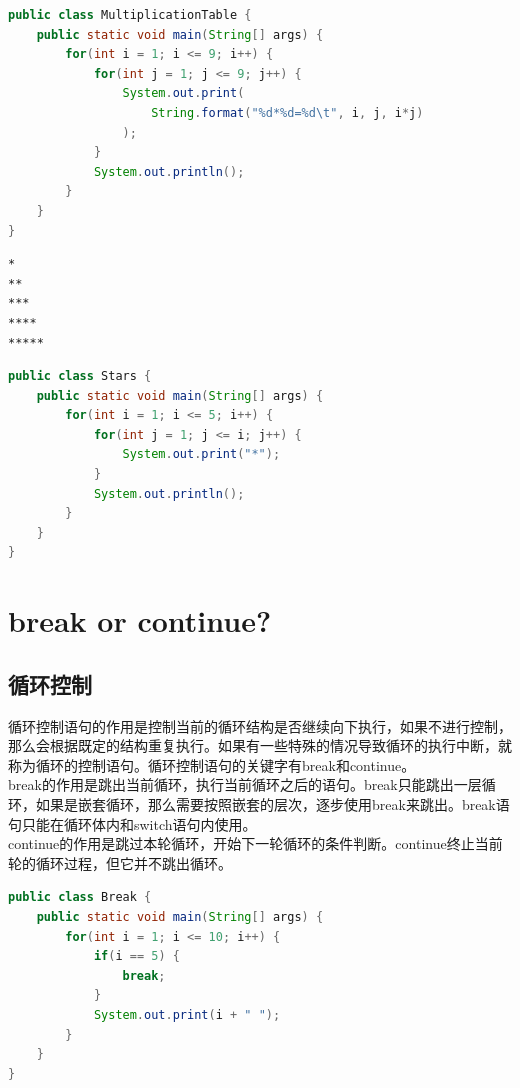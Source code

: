 \begin{lstlisting}[language=Java]
public class MultiplicationTable {
    public static void main(String[] args) {
        for(int i = 1; i <= 9; i++) {
            for(int j = 1; j <= 9; j++) {
                System.out.print(
                    String.format("%d*%d=%d\t", i, j, i*j)
                );
            }
            System.out.println();
        }
    }
}
\end{lstlisting}

\vspace{0.5cm}


\begin{lstlisting}
*
**
***
****
*****
\end{lstlisting}

\begin{lstlisting}[language=Java]
public class Stars {
    public static void main(String[] args) {
        for(int i = 1; i <= 5; i++) {
            for(int j = 1; j <= i; j++) {
                System.out.print("*");
            }
            System.out.println();
        }
    }
}
\end{lstlisting}

\newpage

\section{break or continue?}

\subsection{循环控制}

循环控制语句的作用是控制当前的循环结构是否继续向下执行，如果不进行控制，那么会根据既定的结构重复执行。如果有一些特殊的情况导致循环的执行中断，就称为循环的控制语句。循环控制语句的关键字有break和continue。\\

break的作用是跳出当前循环，执行当前循环之后的语句。break只能跳出一层循环，如果是嵌套循环，那么需要按照嵌套的层次，逐步使用break来跳出。break语句只能在循环体内和switch语句内使用。\\

continue的作用是跳过本轮循环，开始下一轮循环的条件判断。continue终止当前轮的循环过程，但它并不跳出循环。\\


\begin{lstlisting}[language=Java]
public class Break {
    public static void main(String[] args) {
        for(int i = 1; i <= 10; i++) {
            if(i == 5) {
                break;
            }
            System.out.print(i + " ");
        }
    }
}
\end{lstlisting}

